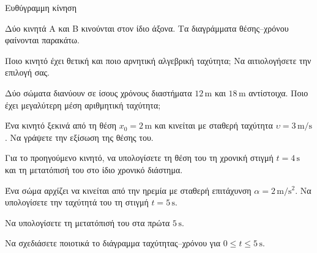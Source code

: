 \begin{Assessment}[student=true,date=true,duration={90 λεπτά}]{Ευθύγραμμη κίνηση}
\begin{AssessmentQuestion}[12]
Δύο κινητά Α και Β κινούνται στον ίδιο άξονα.
Τα διαγράμματα θέσης--χρόνου φαίνονται παρακάτω.
\begin{center}
\end{center}
Ποιο κινητό έχει θετική και ποιο αρνητική αλγεβρική ταχύτητα;
Να αιτιολογήσετε την επιλογή σας.
\end{AssessmentQuestion}
\begin{AssessmentQuestion}[13]
Δύο σώματα διανύουν σε ίσους χρόνους διαστήματα $12\,\mathrm{m}$ και
$18\,\mathrm{m}$ αντίστοιχα. Ποιο έχει μεγαλύτερη μέση αριθμητική ταχύτητα;
\end{AssessmentQuestion}

\begin{AssessmentQuestion}[10]\label{asq:KRI1-G1}
Ένα κινητό ξεκινά από τη θέση $x_0=2\,\mathrm{m}$ και κινείται με
σταθερή ταχύτητα $\upsilon=3\,\mathrm{m/s}$.
Να γράψετε την εξίσωση της θέσης του.
\end{AssessmentQuestion}
\begin{AssessmentQuestion}[15]
Για το προηγούμενο κινητό, να υπολογίσετε τη θέση του τη χρονική στιγμή
$t=4\,\mathrm{s}$ και τη μετατόπισή του στο ίδιο χρονικό διάστημα.
\end{AssessmentQuestion}

\begin{AssessmentQuestion}[9]
Ένα σώμα αρχίζει να κινείται από την ηρεμία με σταθερή επιτάχυνση
$\alpha=2\,\mathrm{m/s^2}$. Να υπολογίσετε την ταχύτητά του τη στιγμή
$t=5\,\mathrm{s}$.
\end{AssessmentQuestion}
\begin{AssessmentQuestion}[8]
Να υπολογίσετε τη μετατόπισή του στα πρώτα $5\,\mathrm{s}$.
\end{AssessmentQuestion}
\begin{AssessmentQuestion}[8]
Να σχεδιάσετε ποιοτικά το διάγραμμα ταχύτητας--χρόνου για
$0\leq t\leq5\,\mathrm{s}$.
\end{AssessmentQuestion}
\AssessmentPointsCheck[100]
\end{Assessment}


